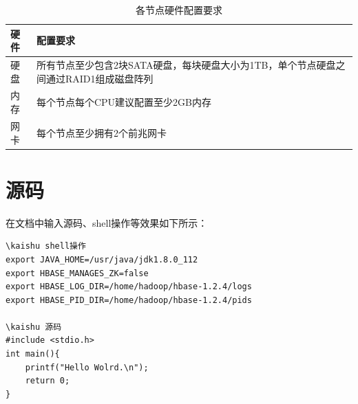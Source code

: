 \begin{table}[htb]
\centering
\label{tableExample}
\begin{tabular}{p{3cm}|p{9cm}}
\hline\hline

\textbf{硬件} & \textbf{配置要求} \\
\hline\hline

硬盘 & 所有节点至少包含2块SATA硬盘，每块硬盘大小为1TB，单个节点硬盘之间通过RAID1组成磁盘阵列 \\
\hline

内存 & 每个节点每个CPU建议配置至少2GB内存 \\
\hline

网卡 & 每个节点至少拥有2个前兆网卡 \\
\hline

\hline\hline
\end{tabular}
\caption{各节点硬件配置要求}
\end{table}


\section{源码}
在文档中输入源码、shell操作等效果如下所示：

\begin{Verbatim}[]
\kaishu shell操作
export JAVA_HOME=/usr/java/jdk1.8.0_112
export HBASE_MANAGES_ZK=false
export HBASE_LOG_DIR=/home/hadoop/hbase-1.2.4/logs
export HBASE_PID_DIR=/home/hadoop/hbase-1.2.4/pids

\kaishu 源码
#include <stdio.h>
int main(){
    printf("Hello Wolrd.\n");
    return 0;
}
\end{Verbatim}


